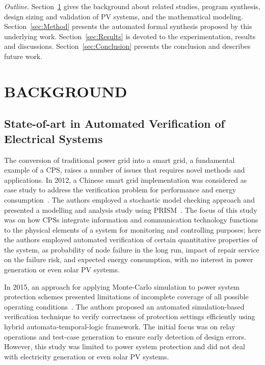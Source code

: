 \documentclass[review]{elsarticle}
\begin{document}
\textit{Outline}. Section~\ref{sec:Background} gives the background about related studies, 
program synthesis, design sizing and validation of PV systems, and the mathematical modeling. 
Section~\ref{sec:Method} presents the automated formal synthesis proposed 
by this underlying work. Section~\ref{sec:Results} is devoted to the experimentation, 
results and discussions. Section~\ref{sec:Conclusion} presents the conclusion and describes future work.
%
\section{BACKGROUND}
\label{sec:Background}

\subsection{State-of-art in Automated Verification of Electrical Systems}

The conversion of traditional power grid into a smart grid, a fundamental example of a CPS, 
raises a number of issues that requires novel methods and applications. 
In 2012, a Chinese smart grid implementation was considered as case study 
to address the verification problem for performance and energy consumption~\cite{Yukseletall2012}. 
The authors employed a stochastic model checking approach and presented 
a modelling and analysis study using PRISM~\cite{KwiatkowskaNP11}. 
The focus of this study was on how CPSs integrate information and 
communication technology functions to the physical elements 
of a system for monitoring and controlling purposes; here the authors 
employed automated verification of certain quantitative properties of the system, 
as probability of	 node failure in the long run, impact of repair service on the failure risk, 
and expected energy consumption, with no interest in power generation or even solar PV systems.

In 2015, an approach for applying Monte-Carlo simulation to power system protection schemes 
presented limitations of incomplete coverage of all possible operating conditions~\cite{Sengupta2015}. 
The authors proposed an automated simulation-based verification technique to verify correctness 
of protection settings efficiently using hybrid automata-temporal-logic framework. 
The initial focus was on relay operations and test-case generation to ensure early detection of design errors. 
However, this study was limited to power system protection and did not deal with electricity generation or even solar PV systems.
\end{document}
